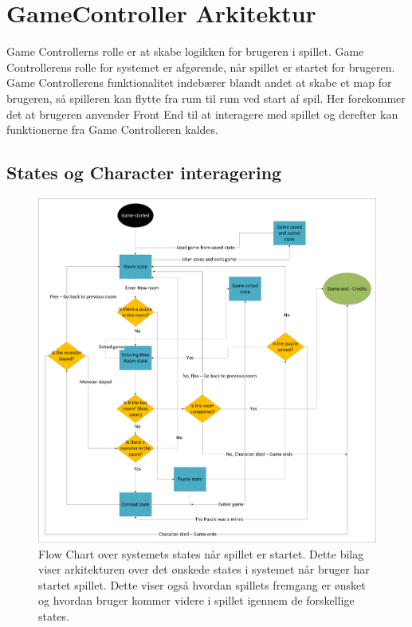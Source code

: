 \section{GameController Arkitektur}
Game Controllerns rolle er at skabe logikken for brugeren i spillet. Game Controllerens rolle for systemet er afgørende, når spillet er startet for brugeren. Game Controllerens funktionalitet indebærer blandt andet at skabe et map for brugeren, så spilleren kan flytte fra rum til rum ved start af spil. Her forekommer det at brugeren anvender Front End til at interagere med spillet og derefter kan funktionerne fra Game Controlleren kaldes.
\subsection{States og Character interagering}
\begin{figure}[H]
\centering
\includegraphics[width = \textwidth]{02-Body/Images/Arkitektur - State Logic.pdf}
\caption{Flow Chart over systemets states når spillet er startet. Dette bilag viser arkitekturen over det ønskede states i systemet når bruger har startet spillet. Dette viser også hvordan spillets fremgang er ønsket og hvordan bruger kommer videre i spillet igennem de forskellige states.}
\label{fig:Arkitektur-SD-SaveGame}
\end{figure}
